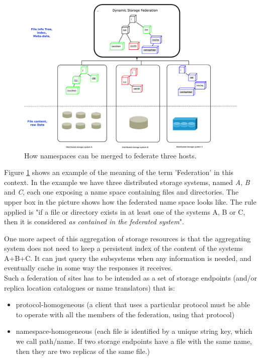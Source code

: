 \documentclass[12pt]{article} %
\begin{document}
\begin{figure}
  \begin{center}
    \includegraphics[width=28pc]{diagram-principle.eps}
  \end{center}
  \caption{\label{fig_mergenamespace}How namespaces can be merged to federate three hosts.}
\end{figure}

Figure \ref{fig_mergenamespace} shows an example of the meaning of the term 'Federation' in this context. In the example we have three distributed storage systems, named \textit{A}, \textit{B} and \textit{C}, each one exposing a name space containing files and directories. The upper box in the picture shows how the federated name space looks like. The rule applied is "if a file or directory exists in at least one of the systems A, B or C, then it is considered \textit{as contained in the federated system}".

One more aspect of this aggregation of storage resources is that the aggregating system does not need to keep a persistent index of the content of the systems A+B+C. It can just query the subsystems when any information is needed, and eventually cache in some way the responses it receives.\\

Such a federation of sites has to be intended as a set of storage endpoints (and/or replica location catalogues or name translators) that is:
\begin{itemize}
\item protocol-homogeneous (a client that uses a particular protocol must be able to operate with all the members of the federation, using that protocol)
\item namespace-homogeneous (each file is identified by a unique string key, which we call path/name. If two storage endpoints have a file with the same name, then they are two replicas of the same file.)
\end{itemize}
\end{document}
